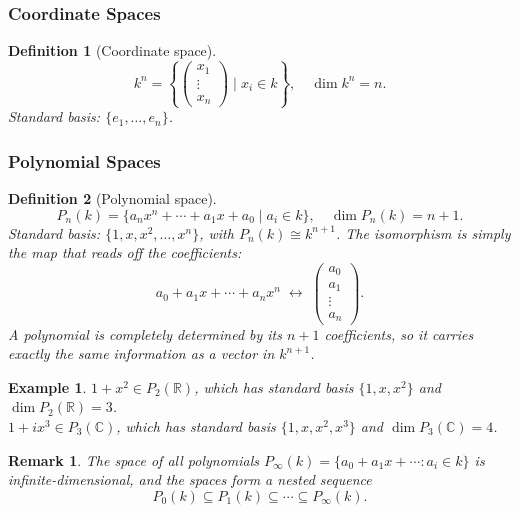 \documentclass{article}
\newtheorem{definition}{Definition}
\newtheorem*{example}{Example}
\newtheorem{remark}{Remark}
\begin{document}
\subsubsection{Coordinate Spaces}
\begin{definition}[Coordinate space]
    \[k^n = \left\{\begin{pmatrix}x_1\\\vdots\\x_n\end{pmatrix} \mid x_i \in k\right\}, \quad \dim k^n = n.\]
    Standard basis: $\{e_1,\ldots,e_n\}$.
\end{definition}

\subsubsection{Polynomial Spaces}
\begin{definition}[Polynomial space]
    \[P_n(k) = \{a_nx^n+\cdots+a_1x+a_0 \mid a_i \in k\}, \quad \dim P_n(k) = n+1.\]
    Standard basis: $\{1,x,x^2,\ldots,x^n\}$, with $P_n(k)\cong k^{n+1}$. The isomorphism is simply the map that reads off the coefficients:
    \[a_0 + a_1x + \cdots + a_nx^n \;\longleftrightarrow\; \begin{pmatrix}a_0\\a_1\\\vdots\\a_n\end{pmatrix}.\]
    A polynomial is completely determined by its $n+1$ coefficients, so it carries exactly the same information as a vector in $k^{n+1}$.
\end{definition}
\begin{example}
    $1+x^2 \in P_2(\mathbb{R})$, which has standard basis $\{1,x,x^2\}$ and $\dim P_2(\mathbb{R}) = 3$.\\
    $1+ix^3 \in P_3(\mathbb{C})$, which has standard basis $\{1,x,x^2,x^3\}$ and $\dim P_3(\mathbb{C}) = 4$.
\end{example}
\begin{remark}
    The space of all polynomials $P_\infty(k) = \{a_0+a_1x+\cdots : a_i \in k\}$ is infinite-dimensional, and the spaces form a nested sequence
    \[P_0(k) \subseteq P_1(k) \subseteq \cdots \subseteq P_\infty(k).\]
\end{remark}
\end{document}
